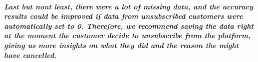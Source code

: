 \documentclass[]{article}
\let\oldsubparagraph\subparagraph
\renewcommand{\subparagraph}[1]{\oldsubparagraph{#1}\mbox{}}
\begin{document}
\subparagraph{Last but nont least, there were a lot of missing data, and
the accuracy results could be improved if data from unsubscribed
customers were automatically set to 0. Therefore, we recommend saving
the data right at the moment the customer decide to unsubscribe from the
platform, giving us more insights on what they did and the reason the
might have
cancelled.}\label{last-but-nont-least-there-were-a-lot-of-missing-data-and-the-accuracy-results-could-be-improved-if-data-from-unsubscribed-customers-were-automatically-set-to-0.-therefore-we-recommend-saving-the-data-right-at-the-moment-the-customer-decide-to-unsubscribe-from-the-platform-giving-us-more-insights-on-what-they-did-and-the-reason-the-might-have-cancelled.}
\end{document}
